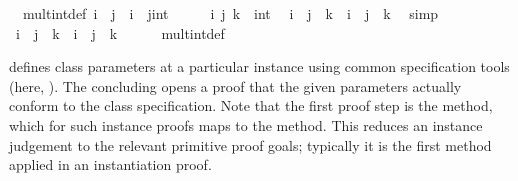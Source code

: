 \begin{isabellebody}
\isanewline
\isanewline
{}\isamarkupfalse%
\isanewline
\ \ mult{}int{}def{}\ {}i\ {}\ j\ {}\ i\ {}\ {}j{}int{}{}\isanewline
\isanewline
{}\isamarkupfalse%
\ \isamarkupfalse%
\isanewline
\ \ \isamarkupfalse%
\ i\ j\ k\ {}{}\ int\ \isamarkupfalse%
\ {}{}i\ {}\ j{}\ {}\ k\ {}\ i\ {}\ {}j\ {}\ k{}{}\ \isamarkupfalse%
\ simp\isanewline
\ \ \isamarkupfalse%
\ \isamarkupfalse%
\ {}{}i\ {}\ j{}\ {}\ k\ {}\ i\ {}\ {}j\ {}\ k{}{}\isanewline
\ \ \ \ \isamarkupfalse%
\ mult{}int{}def\ \isamarkupfalse%
\isanewline
{}\isamarkupfalse%
\isanewline
\isanewline
{}\isamarkupfalse%
%
\endisatagquote
{\isafoldquote}%
%
\isadelimquote
%
\endisadelimquote
%
\begin{isamarkuptext}%
\noindent \hyperlink{command.instantiation}{\mbox{}} defines class parameters at a
  particular instance using common specification tools (here,
  \hyperlink{command.definition}{\mbox{}}).  The concluding \hyperlink{command.instance}{\mbox{}} opens a
  proof that the given parameters actually conform to the class
  specification.  Note that the first proof step is the \hyperlink{method.default}{\mbox{}} method, which for such instance proofs maps to the \hyperlink{method.intro-classes}{\mbox{}} method.  This reduces an instance judgement to the
  relevant primitive proof goals; typically it is the first method
  applied in an instantiation proof.


\end{isamarkuptext}
\end{isabellebody}
